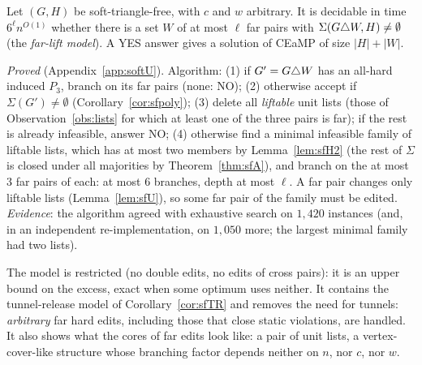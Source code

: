 \begin{theorem}\label{thm:U}
Let $(G,H)$ be soft-triangle-free, with $c$ and $w$ arbitrary. It is decidable in time $6^{\ell}n^{O(1)}$ whether there is a set $W$ of at most $\ell$ far pairs with $\Sigma(G\triangle W,H)\ne\emptyset$ (the \emph{far-lift model}). A YES answer gives a solution of CEaMP of size $|H|+|W|$.
\end{theorem}
\emph{Proved} (Appendix~\ref{app:softU}). Algorithm: (1) if $G'=G\triangle W$ has an all-hard induced $P_3$, branch on its far pairs (none: NO); (2) otherwise accept if $\Sigma(G')\ne\emptyset$ (Corollary~\ref{cor:sfpoly}); (3) delete all \emph{liftable} unit lists (those of Observation~\ref{obs:lists} for which at least one of the three pairs is far); if the rest is already infeasible, answer NO; (4) otherwise find a minimal infeasible family of liftable lists, which has at most two members by Lemma~\ref{lem:sfH2} (the rest of $\Sigma$ is closed under all majorities by Theorem~\ref{thm:sfA}), and branch on the at most $3$ far pairs of each: at most $6$ branches, depth at most $\ell$. A far pair changes only liftable lists (Lemma~\ref{lem:sfU}), so some far pair of the family must be edited. \emph{Evidence}: the algorithm agreed with exhaustive search on $1{,}420$ instances (and, in an independent re-implementation, on $1{,}050$ more; the largest minimal family had two lists).

The model is restricted (no double edits, no edits of cross pairs): it is an upper bound on the excess, exact when some optimum uses neither. It contains the tunnel-release model of Corollary~\ref{cor:sfTR} and removes the need for tunnels: \emph{arbitrary} far hard edits, including those that close static violations, are handled. It also shows what the cores of far edits look like: a pair of unit lists, a vertex-cover-like structure whose branching factor depends neither on $n$, nor $c$, nor $w$.

